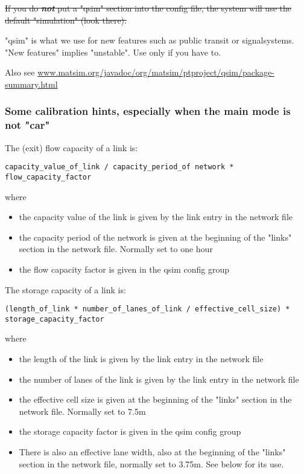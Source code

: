 \documentclass[a4paper,11pt]{report}
\begin{document}
\sout{If you do \textbf{\emph{not}} put a "qsim" section into the config file, the system will use the default "simulation" (look there).}

"qsim"  is what we use for new features such as public transit or  signalsystems. "New features" implies "unstable". Use only  if you have to.

Also see \href{http://www.matsim.org/javadoc/org/matsim/ptproject/qsim/package-summary.html}{www.matsim.org/javadoc/org/matsim/ptproject/qsim/package-summary.html}

\subsubsection{Some calibration hints, especially when the main mode is not "car"}

The (exit) flow capacity of a link is:
\begin{verbatim}
capacity_value_of_link / capacity_period_of network * flow_capacity_factor

\end{verbatim}

where
\begin{itemize}
	\item the capacity value of the link is given by the link entry in the network file
	\item the  capacity period of the network is given at the beginning of the "links"  section in the network file. Normally set to one hour
	\item the flow capacity factor is given in the qsim config group
\end{itemize}

The storage capacity of a link is:
\begin{verbatim}
(length_of_link * number_of_lanes_of_link / effective_cell_size) * storage_capacity_factor

\end{verbatim}

where
\begin{itemize}
	\item the length of the link is given by the link entry in the network file
	\item the number of lanes of the link is given by the link entry in the network file
	\item the effective cell size is given at the beginning of the "links" section in the network file. Normally set to 7.5m
	\item the storage capacity factor is given in the qsim config group
	\item There  is also an effective lane width, also at the beginning of the "links"  section in the network file, normally set to 3.75m. See below for  its use.
\end{itemize}
\end{document}

